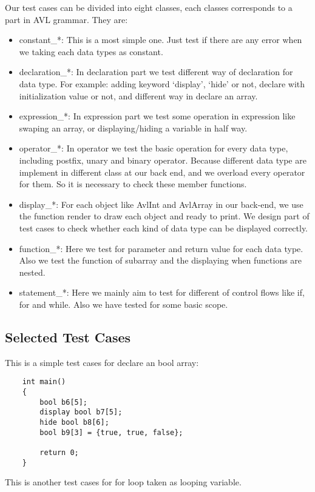 Our test cases can be divided into eight classes, each classes corresponds to a part in AVL grammar.
They are:
\begin{itemize}
\item constant\_*: 
This is a most simple one. Just test if there are any error when we taking each data types as
constant.
\item declaration\_*:
In declaration part we test different way of declaration for data type. For example: adding keyword
‘display’, ‘hide’ or not, declare with initialization value or not, and different way in declare an
array.
\item expression\_*:
In expression part we test some operation in expression like swaping an array, or displaying/hiding
a variable in half way.
\item operator\_*:
In operator we test the basic operation for every data type, including postfix, unary and binary
operator. Because different data type are implement in different class at our back end, and we
overload every operator for them. So it is necessary to check these member functions.
\item display\_*:
For each object like AvlInt and AvlArray in our back-end, we use the function render to draw each
object and ready to print. We design part of test cases to check whether each kind of data type can
be displayed correctly.
\item function\_*: 
Here we test for parameter and return value for each data type. Also we test the function of
subarray and the displaying when functions are nested.
\item statement\_*:
Here we mainly aim to test for different of control flows like if, for and while. Also we have
tested for some basic scope.
\end{itemize}

\subsection{Selected Test Cases}

This is a simple test cases for declare an bool array:

\begin{verbatim}
    int main()
    {
        bool b6[5];
        display bool b7[5];
        hide bool b8[6];
        bool b9[3] = {true, true, false};

        return 0;
    }
\end{verbatim}

This is another test cases for for loop taken as looping variable.

